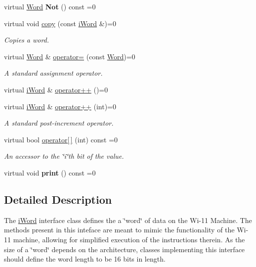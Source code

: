 \begin{DoxyCompactItemize}
\item 
\hypertarget{classiWord_a6a7602a8220d84b5201a789b597fbbde}{
virtual \hyperlink{classWord}{Word} {\bfseries Not} () const =0}
\label{classiWord_a6a7602a8220d84b5201a789b597fbbde}

\item 
virtual void \hyperlink{classiWord_ab9f5df8ced4937c18f16784a98ecf95f}{copy} (const \hyperlink{classiWord}{iWord} \&)=0
\begin{DoxyCompactList}\small\item\em Copies a word. \item\end{DoxyCompactList}\item 
virtual \hyperlink{classWord}{Word} \& \hyperlink{classiWord_a45c9c82054bd2150b77d5f157734cb72}{operator=} (const \hyperlink{classWord}{Word})=0
\begin{DoxyCompactList}\small\item\em A standard assignment operator. \item\end{DoxyCompactList}\item 
virtual \hyperlink{classiWord}{iWord} \& \hyperlink{classiWord_af20040c25b79d2aeae41f1714fbb2cbc}{operator++} ()=0
\item 
virtual \hyperlink{classiWord}{iWord} \& \hyperlink{classiWord_a6777f6f41915179c4255d3647a9eb4b5}{operator++} (int)=0
\begin{DoxyCompactList}\small\item\em A standard post-\/increment operator. \item\end{DoxyCompactList}\item 
virtual bool \hyperlink{classiWord_a2bd140904379329b74c3e1af83eb3a85}{operator\mbox{[}$\,$\mbox{]}} (int) const =0
\begin{DoxyCompactList}\small\item\em An accessor to the \char`\"{}i\char`\"{}th bit of the value. \item\end{DoxyCompactList}\item 
\hypertarget{classiWord_af593586e97d0d728db902ff6f2dba940}{
virtual void {\bfseries print} () const =0}
\label{classiWord_af593586e97d0d728db902ff6f2dba940}

\end{DoxyCompactItemize}


\subsection{Detailed Description}
The \hyperlink{classiWord}{iWord} interface class defines the a \char`\"{}word\char`\"{} of data on the Wi-\/11 Machine. The methods present in this inteface are meant to mimic the functionality of the Wi-\/11 machine, allowing for simplified execution of the instructions therein. As the size of a \char`\"{}word\char`\"{} depends on the architecture, classes implementing this interface should define the word length to be 16 bits in length. 

